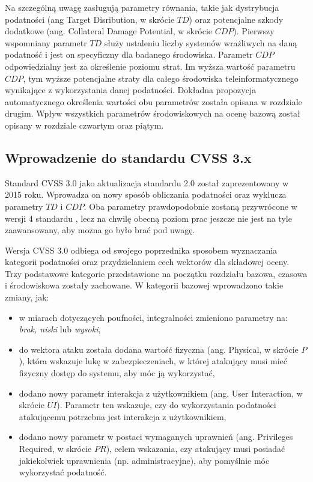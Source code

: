 \bigbreak
Na szczególną uwagę zasługują parametry równania, takie jak dystrybucja podatności (ang Target Disribution, w skrócie $TD$) oraz potencjalne szkody dodatkowe (ang. Collateral Damage Potential, w skrócie $CDP$). Pierwszy wspomniany parametr $TD$ służy ustaleniu liczby systemów wrażliwych na daną podatność i jest on specyficzny dla badanego środowiska. Parametr $CDP$ odpowiedzialny jest za określenie poziomu strat. Im wyższa wartość parametru $CDP$, tym wyższe potencjalne straty dla całego środowiska teleinformatycznego wynikające z wykorzystania danej podatności. Dokładna propozycja automatycznego określenia wartości obu parametrów została opisana w rozdziale drugim. Wpływ wszystkich parametrów środowiskowych na ocenę bazową został opisany w rozdziale czwartym oraz piątym.

\FloatBarrier

\subsection{Wprowadzenie do standardu CVSS 3.x}
\label{sec:cvss_3_standard}
Standard CVSS 3.0 jako aktualizacja standardu 2.0 został zaprezentowany w 2015 roku. Wprowadza on nowy sposób obliczania podatności oraz wyklucza parametry $TD$ i $CDP$. Oba parametry prawdopodobnie zostaną przywrócone w wersji 4 standardu \cite{cvs2021improvements}, lecz na chwilę obecną poziom prac jeszcze nie jest na tyle zaawansowany, aby można go było brać pod uwagę.

\bigbreak
Wersja CVSS 3.0 odbiega od swojego poprzednika sposobem wyznaczania kategorii podatności oraz przydzielaniem cech wektorów dla składowej oceny. Trzy podstawowe kategorie przedstawione na początku rozdziału bazowa, czasowa i środowiskowa zostały zachowane. W kategorii bazowej wprowadzono takie zmiany, jak:
\begin{itemize}
    \item w miarach dotyczących poufności, integralności zmieniono parametry na: \emph{brak, niski} lub \emph{wysoki},
    \item do wektora ataku została dodana wartość fizyczna (ang. Physical, w skrócie $P$), która wskazuje lukę w zabezpieczeniach, w której atakujący musi mieć fizyczny dostęp do systemu, aby móc ją wykorzystać,
    \item dodano nowy parametr interakcja z użytkownikiem (ang. User Interaction, w skrócie $UI$). Parametr ten wskazuje, czy do wykorzystania podatności atakującemu potrzebna jest interakcja z użytkownikiem,
    \item dodano nowy parametr w postaci wymaganych uprawnień (ang. Privileges Required, w skrócie $PR$), celem wskazania, czy atakujący musi posiadać jakiekolwiek uprawnienia (np. administracyjne), aby pomyślnie móc wykorzystać podatność.
\end{itemize}


